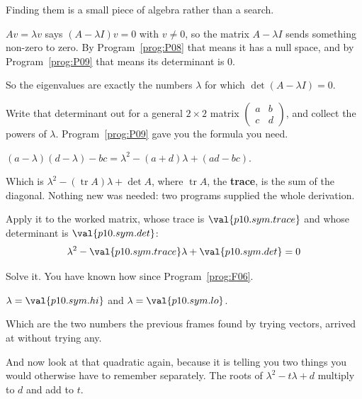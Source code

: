 \begin{fr}
Finding them is a small piece of algebra rather than a search.

$Av = \lambda v$ says $(A - \lambda I)v = 0$ with $v \ne 0$, so the matrix
$A - \lambda I$ sends something non-zero to zero. By
Program~\ref{prog:P08} that means it has a null space, and by
Program~\ref{prog:P09} that means its determinant is $0$.

So the eigenvalues are exactly the numbers $\lambda$ for which
$\det(A - \lambda I) = 0$.

Write that determinant out for a general $2 \times 2$ matrix
$\begin{pmatrix} a & b \\ c & d \end{pmatrix}$, and collect the powers of
$\lambda$. Program~\ref{prog:P09} gave you the formula you need.
\dotline
\nextframe
\end{fr}

\begin{fr}
\begin{ansblock}
$(a - \lambda)(d - \lambda) - bc = \lambda^{2} - (a + d)\lambda + (ad - bc)$.
\end{ansblock}

Which is $\lambda^{2} - (\operatorname{tr}A)\lambda + \det A$, where
$\operatorname{tr}A$, the \textbf{trace}, is the sum of the diagonal. Nothing
new was needed: two programs supplied the whole derivation.

Apply it to the worked matrix, whose trace is $\val{p10.sym.trace}$ and whose
determinant is $\val{p10.sym.det}$:
\[ \lambda^{2} - \val{p10.sym.trace}\lambda + \val{p10.sym.det} = 0 \]

Solve it. You have known how since Program~\ref{prog:F06}.
\dotline
\nextframe
\end{fr}

\begin{fr}
\begin{ansblock}
$\lambda = \val{p10.sym.hi}$ and $\lambda = \val{p10.sym.lo}$.
\end{ansblock}

Which are the two numbers the previous frames found by trying vectors, arrived
at without trying any.

And now look at that quadratic again, because it is telling you two things you
would otherwise have to remember separately. The roots of
$\lambda^{2} - t\lambda + d$ multiply to $d$ and add to $t$.
\end{fr}

